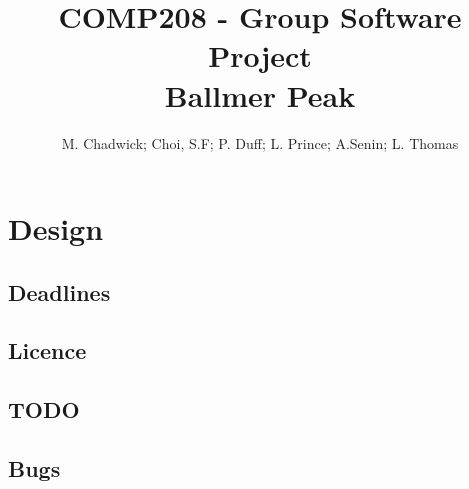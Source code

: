 \documentclass[openany]{book}
\title{COMP208 - Group Software Project\\Ballmer Peak}
\author{M. Chadwick; Choi, S.F; P. Duff; L. Prince; A.Senin; L. Thomas}
\begin{document}
\maketitle
\tableofcontents

%

\part{Design}


\begin{appendices}
\appendixpage %
\noappendicestocpagenum %
\addappheadtotoc %

\chapter{Deadlines}

\chapter{Licence}

\chapter{TODO}

\chapter{Bugs}

\end{appendices}

\listoftodos
\todototoc

\printbibliography
\end{document}
